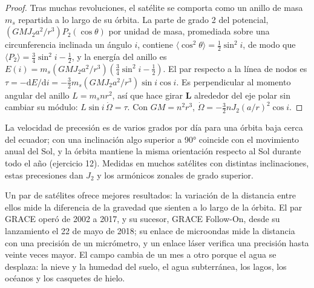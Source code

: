 \begin{proof}
Tras muchas revoluciones, el satélite se comporta como un anillo de masa $m_s$ repartida
a lo largo de su órbita. La parte de grado 2 del potencial,
$(GMJ_2a^2/r^3)P_2(\cos\theta)$ por unidad de masa, promediada sobre una circunferencia
inclinada un ángulo $i$, contiene $\langle\cos^2\theta\rangle = \tfrac12\sin^2i$, de modo que
$\langle P_2\rangle = \tfrac34\sin^2i - \tfrac12$, y la energía del anillo es
$E(i) = m_s(GMJ_2a^2/r^3)(\tfrac34\sin^2i - \tfrac12)$. El par respecto a la línea
de nodos es $\tau = -\mathrm dE/\mathrm di = -\tfrac32m_s(GMJ_2a^2/r^3)\sin
i\cos i$. Es perpendicular al momento angular del anillo $L = m_snr^2$, así que
hace girar $\mathbf L$ alrededor del eje polar sin cambiar su módulo:
$L\sin i\,\dot\Omega = \tau$. Con $GM = n^2r^3$, $\dot\Omega =
-\tfrac32nJ_2(a/r)^2\cos i$.
\end{proof}

La velocidad de precesión es de varios grados por día para una órbita baja cerca del
ecuador; con una inclinación algo superior a \ang{90} coincide con el movimiento anual
del Sol, y la órbita mantiene la misma orientación respecto al Sol durante todo el año
(ejercicio 12). Medidas en muchos satélites con distintas inclinaciones, estas
precesiones dan $J_2$ y los armónicos zonales de grado superior.

Un par de satélites ofrece mejores resultados: la variación de la distancia entre ellos
mide la diferencia de la gravedad que sienten a lo largo de la órbita. El par GRACE
operó de 2002 a 2017, y su sucesor, GRACE Follow-On, desde su lanzamiento el 22 de
mayo de 2018; su enlace de microondas mide la distancia con una precisión de un
micrómetro, y un enlace láser verifica una precisión hasta veinte veces mayor.
El campo cambia de un mes a otro porque el agua se desplaza: la nieve y la humedad
del suelo, el agua subterránea, los lagos, los océanos y los casquetes de hielo.

